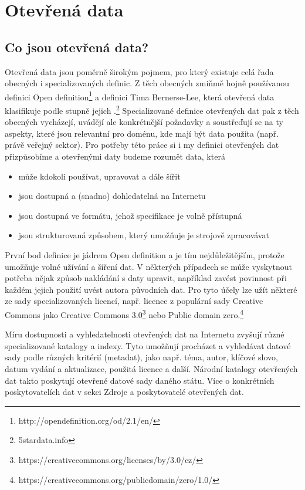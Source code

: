 \chapter{Otevřená data}
\section{Co jsou otevřená data?}
Otevřená data jsou poměrně širokým pojmem, pro který existuje celá řada obecných i specializovaných definic. Z těch obecných zmiňmě hojně používanou definici Open definition\footnote{http://opendefinition.org/od/2.1/en/} a definici Tima Bernerse-Lee, která otevřená data klasifikuje podle stupně jejich .\footnote{5stardata.info} Specializované definice otevřených dat pak z těch obecných vycházejí, uvádějí ale konkrétnější požadavky a soustřeďují se na ty aspekty, které jsou relevantní pro doménu, kde mají být data použita (např. právě veřejný sektor). Pro potřeby této práce si i my definici otevřených dat přizpůsobíme a otevřenými daty budeme rozumět data, která
\begin{itemize}
	\item může kdokoli používat, upravovat a dále šířit
	\item jsou dostupná a (snadno) dohledatelná na Internetu
	\item jsou dostupná ve formátu, jehož specifikace je volně přístupná
	\item jsou strukturovaná způsobem, který umožňuje je strojově zpracovávat
\end{itemize}

První bod definice je jádrem Open definition a je tím nejdůležitějším, protože umožňuje volné užívání a šíření dat. V některých případech se může vyskytnout potřeba nějak způsob nakládání s daty upravit, například zavést povinnost při každém jejich použití uvést autora původních dat. Pro tyto účely lze užít některé ze sady specializovaných licencí, např. licence z populární sady Creative Commons jako Creative Commons 3.0\footnote{https://creativecommons.org/licenses/by/3.0/cz/} nebo Public domain zero.\footnote{https://creativecommons.org/publicdomain/zero/1.0/}

Míru dostupnosti a vyhledatelnosti otevřených dat na Internetu zvyšují různé specializované katalogy a indexy. Tyto umožňují procházet a vyhledávat datové sady podle různých kritérií (metadat), jako např. téma, autor, klíčové slovo, datum vydání a aktualizace, použitá licence a další. Národní katalogy otevřených dat takto poskytují otevřené datové sady daného státu. Více o konkrétních poskytovatelích dat v sekci Zdroje a poskytovatelé otevřených dat.

